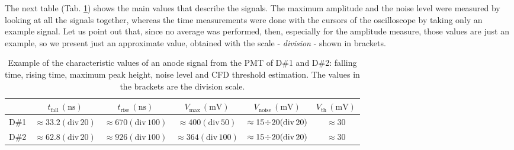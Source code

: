 \documentclass[a4paper]{article}
\begin{document}
The next table (Tab. \ref{tab:pmt_signals}) shows the main values that describe the signals. The maximum amplitude and the noise level were measured by looking at all the signals together, whereas the time measurements were done with the cursors of the oscilloscope by taking only an example signal. Let us point out that, since no average was performed, then, 
especially for the amplitude measure, those values are just an example, so we present just an approximate value, obtained with the scale - \textit{division} - shown in brackets.
\begin{table}[H]
    \centering
    \captionsetup{width=.95\linewidth}
    \begin{tabular}{|l|ccccc|}
         \hline
         & $t_{\mathrm{fall}}\, \mathrm{(ns)}$ & $t_{\mathrm{rise}}\, \mathrm{(ns)}$ & $V_{\mathrm{max}}\, \mathrm{(mV)} $ & $V_{\mathrm{noise}}\, \mathrm{(mV)}$ & $V_{\mathrm{th}}\, \mathrm{(mV)}$\\
         \hline
         D\#1 & $\approx33.2(\mathrm{div}\,20)$ & $\approx670(\mathrm{div}\,100)$ & $\approx400(\mathrm{div}\,50)$ & $\approx15\!\divisionsymbol \!20(\mathrm{div}\,20)$ & $\approx 30$\\ 
         D\#2 & $\approx62.8(\mathrm{div}\,20)$& $\approx926(\mathrm{div}\,100)$  & $\approx364(\mathrm{div}\,100)$ & $\approx15\!\divisionsymbol \!20(\mathrm{div}\,20)$ & $\approx 30$\\
        \hline         
    \end{tabular}
    \caption{Example of the characteristic values of an anode signal from the PMT of D\#1 and D\#2: falling time, rising time, maximum peak height, noise level and CFD threshold estimation. The values in the brackets are the division scale.} 
    \label{tab:pmt_signals}
\end{table}
\end{document}
